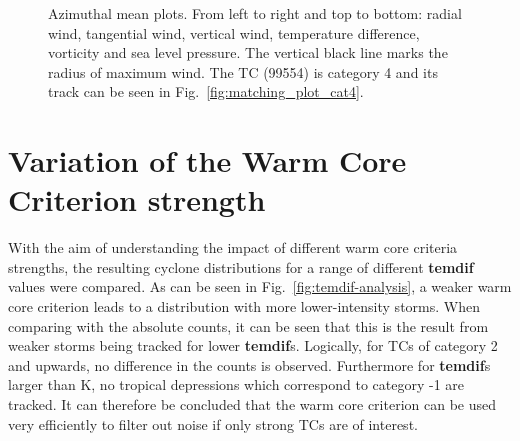 \begin{figure}[!htb]
	\caption[short]{Azimuthal mean plots. From left to right and top to bottom: radial wind, tangential wind, vertical wind, temperature difference, vorticity and sea level pressure. The vertical black line marks the radius of maximum wind. The TC (99554) is category 4 and its track can be seen in Fig.~\ref{fig:matching_plot_cat4}.}
	\label{fig:azimean}
\end{figure}


\section{Variation of the Warm Core Criterion strength}
With the aim of understanding the impact of different warm core criteria strengths, the resulting cyclone distributions for a range of different \textbf{temdif} values were compared. As can be seen in Fig.~\ref{fig:temdif-analysis}, a weaker warm core criterion leads to a distribution with more lower-intensity storms. When comparing with the absolute counts, it can be seen that this is the result from weaker storms being tracked for lower \textbf{temdif}s. Logically, for TCs of category 2 and upwards, no difference in the counts is observed. Furthermore for \textbf{temdif}s larger than \unit[1]{K}, no tropical depressions which correspond to category -1 are tracked. It can therefore be concluded that the warm core criterion can be used very efficiently to filter out noise if only strong TCs are of interest.

